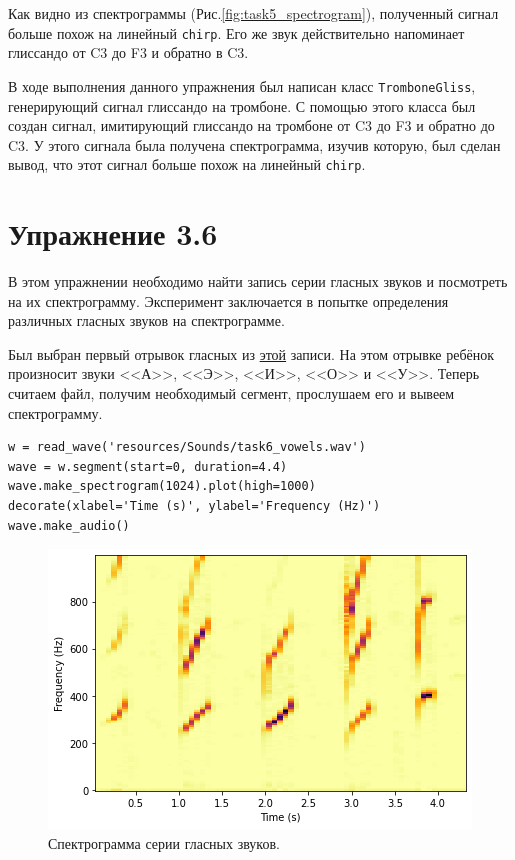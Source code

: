 \documentclass[a4paper, 14pt]{extarticle}
\begin{document}
    Как видно из спектрограммы (Рис.\ref{fig:task5_spectrogram}), полученный сигнал больше похож на линейный \texttt{chirp}.
    Его же звук действительно напоминает глиссандо от C3 до F3 и обратно в C3.

    В ходе выполнения данного упражнения был написан класс \texttt{TromboneGliss}, генерирующий сигнал глиссандо на тромбоне.
    С помощью этого класса был создан сигнал, имитирующий глиссандо на тромбоне от C3 до F3 и обратно до C3.
    У этого сигнала была получена спектрограмма, изучив которую, был сделан вывод, что этот сигнал больше похож на
    линейный \texttt{chirp}.

    \newpage

    \section{Упражнение 3.6}
    \label{sec:task6}

    В этом упражнении необходимо найти запись серии гласных звуков и посмотреть на их спектрограмму. Эксперимент
    заключается в попытке определения различных гласных звуков на спектрограмме.

    Был выбран первый отрывок гласных из \href{https://freesound.org/people/cbelloso/sounds/523055/}{этой} записи.
    На этом отрывке ребёнок произносит звуки <<А>>, <<Э>>, <<И>>, <<О>> и <<У>>. Теперь считаем файл, получим необходимый сегмент, прослушаем его и вывеем спектрограмму.

    \begin{lstlisting}[caption= Формирование нужного сгемента и вывод спектрограммы., label={lst:task5_signal_down}]
w = read_wave('resources/Sounds/task6_vowels.wav')
wave = w.segment(start=0, duration=4.4)
wave.make_spectrogram(1024).plot(high=1000)
decorate(xlabel='Time (s)', ylabel='Frequency (Hz)')
wave.make_audio()
    \end{lstlisting}

    \begin{figure}[h]
        \centering
        \includegraphics[width=0.65\linewidth]{resources/Images/task6_spectrogram}
        \caption{Спектрограмма серии гласных звуков.}
        \label{fig:task6_spectrogram}
    \end{figure}
\end{document}
